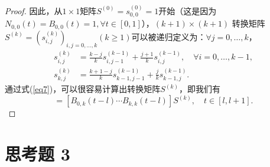 \documentclass[utf8]{ctexart}
\begin{document}
\begin{proof}
    因此，从$1\times 1$矩阵$S^{(0)}=s_{0,0}^{(0)}=1$开始（这是因为$N_{0,0}(t)=B_{0,0}(t)=1,\forall t\in [0,1]$），$(k+1)\times (k+1)$
    转换矩阵$S^{(k)} = (s_{i,j}^{(k)})_{i,j=0,\dots,k}(k\geq 1)$可以被递归定义为：$\forall j = 0,\dots,k$，
    \begin{equation}
        \begin{aligned}
            s_{i,j}^{(k)} &= \frac{k-j}{k}s_{i,j-1}^{(k-1)} + \frac{j+1}{k}s_{i,j}^{(k-1)},\quad \forall i = 0,\dots,k-1,\\
            s_{k,j}^{(k)} &= \frac{k+1-j}{k}s_{k-1,j-1}^{(k-1)} + \frac{j}{k}s_{k-1,j}^{(k-1)}.
            \label{eq7}
        \end{aligned}
    \end{equation}
    通过式(\ref{eq7})，可以很容易计算出转换矩阵$S^{(k)}$，即我们有
\begin{equation}
    [N_{l-k,k}(t)\cdots N_{l,k}(t)] = [B_{0,k}(t-l)\cdots B_{k,k}(t-l)]S^{(k)},\quad t\in [l,l+1].
    \label{eq8}
\end{equation}
\end{proof}
\section*{思考题 3}
\end{document}
